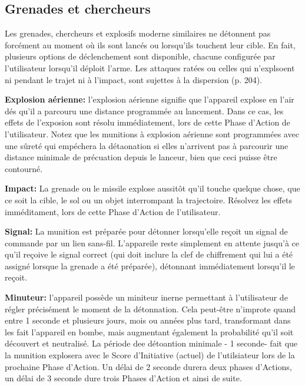 \subsection{Grenades et chercheurs} \label{sec:combat-grenades-seekers} 

Les grenades, chercheurs et explosifs moderne similaires ne détonnent pas forcément au moment où ils sont lancés ou lorsqu'ils touchent leur cible. En fait, plusieurs options de déclenchement sont disponible, chacune configurée par l'utilisateur lorsqu'il déploit l'arme. Les attaques ratées ou celles qui n'explsoent ni pendant le trajet ni à l'impact, sont sujettes à la dispersion (p. 204). 

\textbf{Explosion aérienne:} l'explosion aérienne signifie que l'appareil explose en l'air dés qu'il a parcouru une distance programmée au lancement. Dans ce cas, les effets de l'exposion sont résolu immédiatement, lors de cette Phase d'Action de l'utilisateur. Notez que les munitions à explosion aérienne sont programmées avec une sûreté qui empéchera la détaonation si elles n'arrivent pas à parcourir une distance minimale de précuation depuis le lanceur, bien que ceci puisse être contourné. 

\textbf{Impact:} La grenade ou le missile explose aussitôt qu'il touche quelque chose, que ce soit la cible, le sol ou un objet interrompant la trajectoire. Résolvez les effets imméditament, lors de cette Phase d'Action de l'utilisateur. 

\textbf{Signal:} La munition est préparée pour détonner lorsqu'elle reçoit un signal de commande par un lien sans-fil. L'appareile reste simplement en attente jusqu'à ce qu'il reçoive le signal correct (qui doit inclure la clef de chiffrement qui lui a été assigné lorsque la grenade a été préparée), détonnant immédiatement lorsqu'il le reçoit. 

\textbf{Minuteur:} l'appareil possède un miniteur inerne permettant à l'utilisateur de régler précisément le moment de la détonnation. Cela peut-être n'improte quand entre 1 seconde et plusieurs jours, mois ou années plus tard, transformant dans les fait l'appareil en bombe, mais augmentant également la probabilité qu'il soit découvert et neutralisé. La période dee détoantion minimale - 1 seconde- fait que la munition explosera avec le Score d'Initiative (actuel) de l'utilsiateur lors de la prochaine Phase d'Action. Un délai de 2 seconde durera deux phases d'Actions, un délai de 3 seconde dure trois Phases d'Action et ainsi de suite. 


